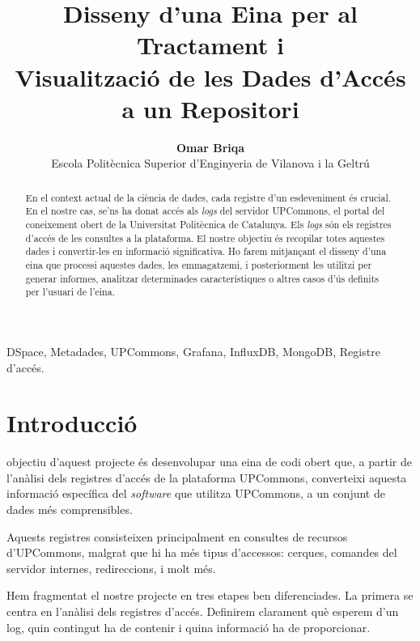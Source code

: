 \documentclass[lettersize,journal]{IEEEtran}
\begin{document}
\title{Disseny d'una Eina per al Tractament i \\ Visualització de les Dades d'Accés a un Repositori}
\author{\textbf{Omar Briqa} \\ \vspace{5pt} Escola Politècnica Superior d'Enginyeria de Vilanova i la Geltrú}
\maketitle

\begin{abstract}
En el context actual de la ciència de dades, cada registre d'un esdeveniment és crucial.
En el nostre cas, se'ns ha donat accés als \textit{logs} del servidor UPCommons, el portal del coneixement obert de la Universitat Politècnica de Catalunya.
Els \textit{logs} són els registres d'accés de les consultes a la plataforma.
El nostre objectiu és recopilar totes aquestes dades i convertir-les en informació significativa.
Ho farem mitjançant el disseny d'una eina que processi aquestes dades, les emmagatzemi, i posteriorment les utilitzi per generar informes, analitzar determinades característiques o altres casos d'ús definits per l'usuari de l'eina.
\end{abstract}

\begin{IEEEkeywords}
    DSpace, Metadades, UPCommons, Grafana, InfluxDB, MongoDB, Registre d'accés.
\end{IEEEkeywords}


\section{Introducció}\label{sec:introduction}
 objectiu d'aquest projecte és desenvolupar una eina de codi obert que, a partir de l'anàlisi dels registres d'accés de la plataforma UPCommons, converteixi aquesta informació específica del \textit{software} que utilitza UPCommons, a un conjunt de dades més comprensibles.

Aquests registres consisteixen principalment en consultes de recursos d’UPCommons, malgrat que hi ha més tipus d’accessos: cerques, comandes del servidor internes, redireccions, i molt més.

Hem fragmentat el nostre projecte en tres etapes ben diferenciades.
La primera se centra en l’anàlisi dels registres d’accés.
Definirem clarament què esperem d’un log, quin contingut ha de contenir i quina informació ha de proporcionar.
\end{document}
